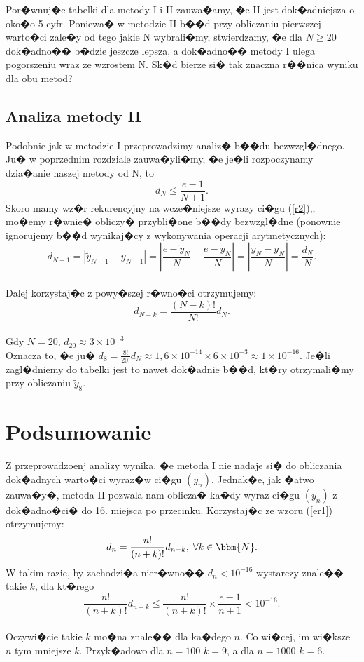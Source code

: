 \documentclass[12pt,wide]{mwart}
\begin{document}
Por�wnuj�c tabelki dla metody I i II zauwa�amy, �e II jest dok�adniejsza o oko�o 5 cyfr. Poniewa� w metodzie II b��d przy obliczaniu pierwszej warto�ci zale�y od tego jakie N wybrali�my, stwierdzamy, �e dla $N \geq 20$  dok�adno�� b�dzie jeszcze lepsza, a dok�adno�� metody I ulega pogorszeniu wraz ze wzrostem N. Sk�d bierze si� tak znaczna r��nica wyniku dla obu metod? 

\subsection{Analiza metody II}
Podobnie jak w metodzie I przeprowadzimy analiz� b��du bezwzgl�dnego. Ju� w poprzednim rozdziale zauwa�yli�my, �e je�li rozpoczynamy dzia�anie naszej metody od N, to 
$$
d_N \leq \frac{e-1}{N+1}.
$$
Skoro mamy wz�r rekurencyjny na wcze�niejsze wyrazy ci�gu (\ref{r2}),, mo�emy r�wnie� obliczy� przybli�one b��dy bezwzgl�dne (ponownie ignorujemy b��d wynikaj�cy z wykonywania operacji arytmetycznych):\\
\begin{equation}
	d_{N-1} = \left|\tilde{y}_{N-1} - y_{N-1}\right| = \left|\frac{e-\tilde{y}_N}{N} - \frac{e-y_N}{N}\right| =
		\left|\frac{\tilde{y}_N - y_N}{N}\right| = \frac{d_N}{N}. 
\end{equation}\\
Dalej korzystaj�c z powy�szej r�wno�ci otrzymujemy:\\
\begin{equation}\label{er1}
	d_{N-k} = \frac{(N-k)!}{N!}d_N.
\end{equation}\\

\noindent
Gdy $N=20$, $d_{20} \approx 3\times10^{-3}$\\
Oznacza to, �e ju� $d_8 = \frac{8!}{20!}d_N \approx 1,6 \times 10^{-14} \times 6 \times 10^{-3} \approx 1\times10^{-16}$. Je�li zagl�dniemy do tabelki jest to nawet dok�adnie b��d, kt�ry otrzymali�my przy obliczaniu $\tilde{y}_8$. 


\section{Podsumowanie}

Z przeprowadzoenj analizy wynika, �e metoda I nie nadaje si� do obliczania dok�adnych warto�ci wyraz�w ci�gu $(y_n)$. Jednak�e, jak �atwo zauwa�y�, metoda II pozwala nam oblicza� ka�dy wyraz ci�gu $(y_n)$ z dok�adno�ci� do 16. miejsca po przecinku. Korzystaj�c ze wzoru (\ref{er1}) otrzymujemy:\\
\begin{equation}
	d_n = \frac{n!}{(n+k)!}d_{n+k},\; \forall k \in \bbm{N}. 
\end{equation}
W takim razie, by zachodzi�a nier�wno�� $d_n < 10^{-16}$ wystarczy znale�� takie $k$, dla kt�rego 
$$
\frac{n!}{(n+k)!}d_{n+k} \leq \frac{n!}{(n+k)!} \times \frac{e-1}{n+1} < 10^{-16}.
$$\\
Oczywi�cie takie $k$ mo�na znale�� dla ka�dego $n$. Co wi�cej, im wi�ksze $n$ tym mniejsze $k$. Przyk�adowo dla $n=100$ $k = 9$, a dla $n = 1000$ $k=6$. 
\end{document}
